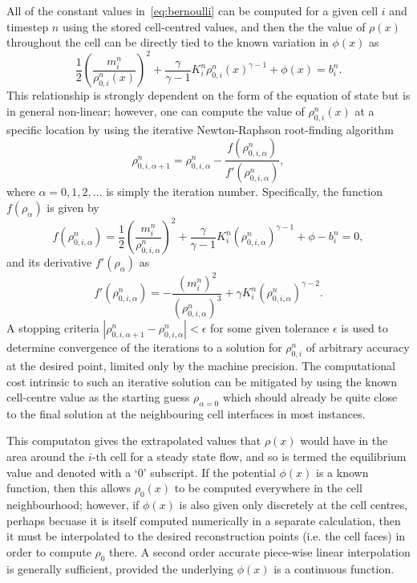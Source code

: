 All of the constant values in~\eqref{eq:bernoulli} can be computed for a given cell $i$ and timestep $n$ using the stored cell-centred values, and then the the value of $\rho(x)$ throughout the cell can be directly tied to the known variation in $\phi(x)$ as
\begin{equation} \label{eq:equilibRecon}
\frac{1}{2}\left(\frac{m_i^n}{\rho_{0,i}^n(x)}\right)^2+\frac{\gamma}{\gamma-1}K_i^n\rho_{0,i}^n(x)^{\gamma-1}+\phi(x)=b_i^n.
\end{equation}
This relationship is strongly dependent on the form of the equation of state but is in general non-linear; however, one can compute the value of $\rho_{0,i}^n(x)$ at a specific location by using the iterative Newton-Raphson root-finding algorithm
\begin{equation}
\rho_{0,i,\alpha+1}^n=\rho_{0,i,\alpha}^n-\frac{f(\rho_{0,i,\alpha}^n)}{f'(\rho_{0,i,\alpha}^n)},
\end{equation}
where $\alpha=0,1,2,...$ is simply the iteration number. Specifically, the function $f(\rho_\alpha)$ is given by
\begin{equation}
f(\rho_{0,i,\alpha}^n)=\frac{1}{2}\left(\frac{m_i^n}{\rho_{0,i,\alpha}^n}\right)^2+\frac{\gamma}{\gamma-1}K_i^n\left(\rho_{0,i,\alpha}^n\right)^{\gamma-1}+\phi-b_i^n=0,
\end{equation}
and its derivative $f'(\rho_\alpha)$ as
\begin{equation}
f'(\rho_{0,i,\alpha}^n)=-\frac{(m_i^n)^2}{\left(\rho_{0,i,\alpha}^n\right)^3}+\gamma K_i^n\left(\rho_{0,i,\alpha}^n\right)^{\gamma-2}.
\end{equation}
A stopping criteria $\left|\rho_{0,i,\alpha+1}^n-\rho_{0,i,\alpha}^n\right|<\epsilon$ for some given tolerance $\epsilon$ is used to determine convergence of the iterations to a solution for $\rho_{0,i}^n$ of arbitrary accuracy at the desired point, limited only by the machine precision. The computational cost intrinsic to such an iterative solution can be mitigated by using the known cell-centre value as the starting guess $\rho_{\alpha=0}$ which should already be quite close to the final solution at the neighbouring cell interfaces in most instances.

This computaton gives the extrapolated values that $\rho(x)$ would have in the area around the $i\textrm{-th}$ cell for a steady state flow, and so is termed the equilibrium value and denoted with a `$0$' subscript. If the potential $\phi(x)$ is a known function, then this allows $\rho_0(x)$ to be computed everywhere in the cell neighbourhood; however, if $\phi(x)$ is also given only discretely at the cell centres, perhaps becuase it is itself computed numerically in a separate calculation, then it must be interpolated to the desired reconstruction points (i.e. the cell faces) in order to compute $\rho_0$ there. A second order accurate piece-wise linear interpolation is generally sufficient, provided the underlying $\phi(x)$ is a continuous function.

